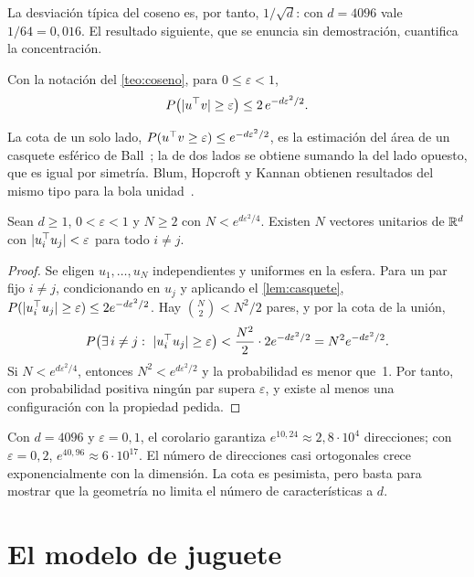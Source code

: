 La desviación típica del coseno es, por tanto, $1/\sqrt{d}$: con $d=4096$ vale $1/64=0{,}016$. El resultado siguiente, que se enuncia sin demostración, cuantifica la concentración.

\begin{lema}\label{lem:casquete}
Con la notación del \cref{teo:coseno}, para $0\le\varepsilon<1$,
\[
P\bigl(\lvert u^{\top} v\rvert\ge\varepsilon\bigr)\le 2\,e^{-d\varepsilon^{2}/2}.
\]
\end{lema}

La cota de un solo lado, $P(u^{\top} v\ge\varepsilon)\le e^{-d\varepsilon^{2}/2}$, es la estimación del área de un casquete esférico de Ball~\cite{ball}; la de dos lados se obtiene sumando la del lado opuesto, que es igual por simetría. Blum, Hopcroft y Kannan obtienen resultados del mismo tipo para la bola unidad~\cite[cap.~2]{bhk}.

\begin{corolario}\label{cor:casi-ortogonales}
Sean $d\ge 1$, $0<\varepsilon<1$ y $N\ge 2$ con $N<e^{d\varepsilon^{2}/4}$. Existen $N$ vectores unitarios de $\mathbb{R}^{d}$ con $\lvert u_i^{\top} u_j\rvert<\varepsilon$ para todo $i\neq j$.
\end{corolario}

\begin{proof}
Se eligen $u_1,\dots,u_N$ independientes y uniformes en la esfera. Para un par fijo $i\neq j$, condicionando en $u_j$ y aplicando el \cref{lem:casquete}, $P(\lvert u_i^{\top} u_j\rvert\ge\varepsilon)\le 2e^{-d\varepsilon^{2}/2}$. Hay $\binom N2<N^{2}/2$ pares, y por la cota de la unión,
\[
P\bigl(\exists\, i\neq j:\ \lvert u_i^{\top} u_j\rvert\ge\varepsilon\bigr)<\frac{N^{2}}{2}\cdot 2e^{-d\varepsilon^{2}/2}=N^{2}e^{-d\varepsilon^{2}/2}.
\]
Si $N<e^{d\varepsilon^{2}/4}$, entonces $N^{2}<e^{d\varepsilon^{2}/2}$ y la probabilidad es menor que~1. Por tanto, con probabilidad positiva ningún par supera $\varepsilon$, y existe al menos una configuración con la propiedad pedida.
\end{proof}

Con $d=4096$ y $\varepsilon=0{,}1$, el corolario garantiza $e^{10{,}24}\approx 2{,}8\cdot 10^{4}$ direcciones; con $\varepsilon=0{,}2$, $e^{40{,}96}\approx 6\cdot 10^{17}$. El número de direcciones casi ortogonales crece exponencialmente con la dimensión. La cota es pesimista, pero basta para mostrar que la geometría no limita el número de características a $d$.

\section{El modelo de juguete}

